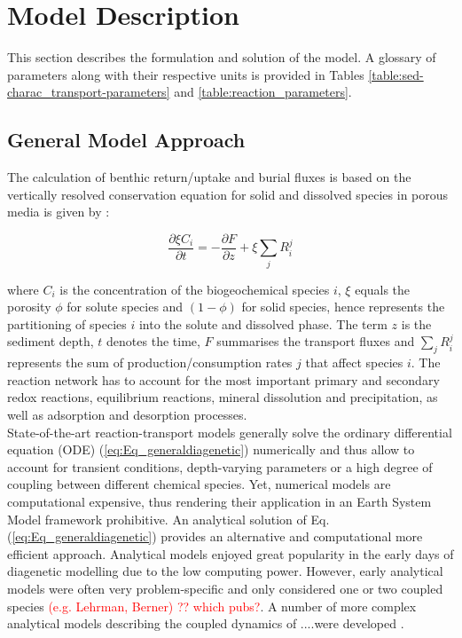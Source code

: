 \documentclass[gmd, manuscript]{copernicus}
\begin{document}
\section{Model Description}
This section describes the formulation and solution of the model. A glossary of parameters along with their respective units is provided in Tables \ref{table:sed-charac_transport-parameters} and \ref{table:reaction_parameters}.

\subsection {General Model Approach} \label{subsec:GeneralModelApproach}
The calculation of benthic return/uptake and burial fluxes is based on the vertically resolved conservation equation for solid and dissolved species in porous media is given by 
\citep[e.g.][]{berner_early_1980, boudreau1997diagenetic}:

\begin{equation} 
\frac{\partial \xi C_i}{\partial t}=-\frac{\partial F}{\partial z}+\xi \sum_j R_i^j \label{eq:Eq_generaldiagenetic}
\end{equation}

where $C_i$ is the concentration of the biogeochemical species $i$, $\xi$ equals the porosity $\phi$ for solute species and $(1-\phi)$ for solid species, hence represents the partitioning of species $i$ 
into the solute and dissolved phase. The term $z$ is the sediment depth, $t$ denotes the time, $F$ summarises the transport fluxes and $\sum_j R_i^j$ represents the sum of production/consumption rates $j$ 
that affect species $i$. The reaction network has to account for the most important primary and secondary redox reactions, equilibrium reactions, mineral dissolution and precipitation, as well as adsorption 
and desorption processes.\\
State-of-the-art reaction-transport models generally solve the ordinary differential equation (ODE) (\ref{eq:Eq_generaldiagenetic}) numerically and thus allow to account for transient conditions, depth-varying parameters or a high degree of coupling 
between different chemical species. Yet, numerical models are computational expensive, thus rendering their application in an Earth System Model framework prohibitive. 
An analytical solution of Eq. (\ref{eq:Eq_generaldiagenetic}) provides an alternative and computational more efficient approach. Analytical models enjoyed great popularity in the early days of diagenetic modelling 
due to the low computing power. However, early analytical models were often very problem-specific and only considered one or two coupled species  \textcolor{red}{(e.g. Lehrman, Berner) ?? which pubs?}. 
A number of more complex analytical models describing the coupled dynamics of ....were developed \citep[e.g.][]{billen1982modelling, goloway1982diagenetic, jahnke1982model}. 
\end{document}
